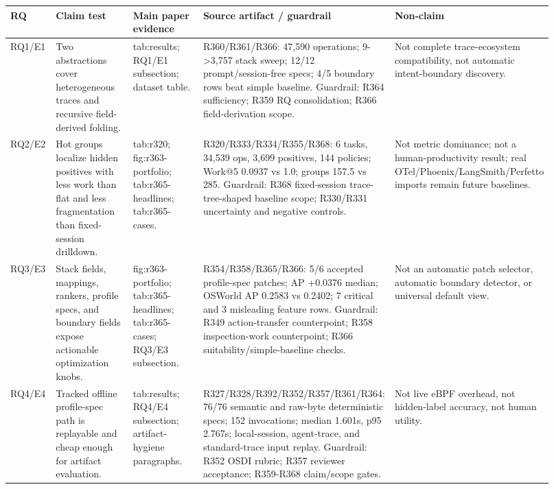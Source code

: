 \begin{tabular}{p{0.09\linewidth}p{0.22\linewidth}p{0.23\linewidth}p{0.22\linewidth}p{0.16\linewidth}}
  \toprule
  RQ & Claim test & Main paper evidence & Source artifact / guardrail & Non-claim \\
  \midrule
  RQ1/E1 & Two abstractions cover heterogeneous traces and recursive field-derived folding. & tab:results; RQ1/E1 subsection; dataset table. & R360/R361/R366: 47,590 operations; 9->3,757 stack sweep; 12/12 prompt/session-free specs; 4/5 boundary rows beat simple baseline. Guardrail: R364 sufficiency; R359 RQ consolidation; R366 field-derivation scope. & Not complete trace-ecosystem compatibility, not automatic intent-boundary discovery. \\
  RQ2/E2 & Hot groups localize hidden positives with less work than flat and less fragmentation than fixed-session drilldown. & tab:r320; fig:r363-portfolio; tab:r365-headlines; tab:r365-cases. & R320/R333/R334/R355/R368: 6 tasks, 34,539 ops, 3,699 positives, 144 policies; Work@5 0.0937 vs 1.0; groups 157.5 vs 285. Guardrail: R368 fixed-session trace-tree-shaped baseline scope; R330/R331 uncertainty and negative controls. & Not metric dominance; not a human-productivity result; real OTel/Phoenix/LangSmith/Perfetto imports remain future baselines. \\
  RQ3/E3 & Stack fields, mappings, rankers, profile specs, and boundary fields expose actionable optimization knobs. & fig:r363-portfolio; tab:r365-headlines; tab:r365-cases; RQ3/E3 subsection. & R354/R358/R365/R366: 5/6 accepted profile-spec patches; AP +0.0376 median; OSWorld AP 0.2583 vs 0.2402; 7 critical and 3 misleading feature rows. Guardrail: R349 action-transfer counterpoint; R358 inspection-work counterpoint; R366 suitability/simple-baseline checks. & Not an automatic patch selector, automatic boundary detector, or universal default view. \\
  RQ4/E4 & Tracked offline profile-spec path is replayable and cheap enough for artifact evaluation. & tab:results; RQ4/E4 subsection; artifact-hygiene paragraphs. & R327/R328/R392/R352/R357/R361/R364: 76/76 semantic and raw-byte deterministic specs; 152 invocations; median 1.601s, p95 2.767s; local-session, agent-trace, and standard-trace input replay. Guardrail: R352 OSDI rubric; R357 reviewer acceptance; R359-R368 claim/scope gates. & Not live eBPF overhead, not hidden-label accuracy, not human utility. \\
  \bottomrule
\end{tabular}
